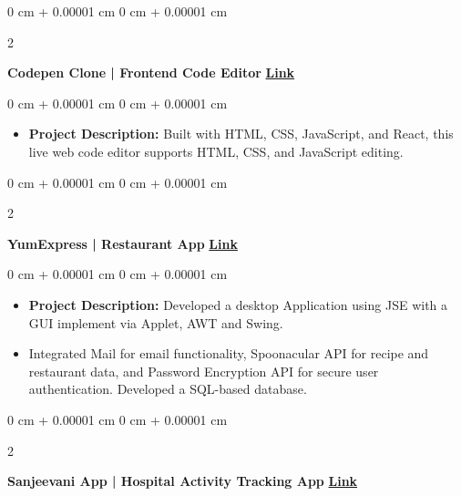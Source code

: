\documentclass[10pt, letterpaper]{article}
\newenvironment{highlights}{
    \begin{itemize}[
        topsep=0.10 cm,
        parsep=0.10 cm,
        partopsep=0pt,
        itemsep=0pt,
        leftmargin=0 cm + 10pt
    ]
}{
    \end{itemize}
}
\newenvironment{onecolentry}{
    \begin{adjustwidth}{
        0 cm + 0.00001 cm
    }{
        0 cm + 0.00001 cm
    }
}{
    \end{adjustwidth}
}
\newenvironment{twocolentry}[2][]{
    \onecolentry
    \def\secondColumn{#2}
    \setcolumnwidth{\fill, 4.5 cm}
    \begin{paracol}{2}
}{
    \switchcolumn \raggedleft \secondColumn
    \end{paracol}
    \endonecolentry
}
\begin{document}
        \begin{twocolentry}{
            \href{https://github.com/saxenabharti/Codepen-clone}{\textbf{\textcolor{highlightColor}{Link}}}
        }
            \textbf{Codepen Clone | Frontend Code Editor}\end{twocolentry}

        \vspace{0.10 cm}
        \begin{onecolentry}
            \begin{highlights}
                \item \textbf{Project Description:}  Built with HTML, CSS, JavaScript, and React, this live web
code editor supports HTML, CSS, and JavaScript editing.
            \end{highlights}
        \end{onecolentry}

        \vspace{0.2 cm}
        \begin{twocolentry}{
            \href{https://github.com/saxenabharti/YumiExpress}{\textbf{\textcolor{highlightColor}{Link}}}
        }
            \textbf{YumExpress | Restaurant App}\end{twocolentry}

        \vspace{0.10 cm}
        \begin{onecolentry}
            \begin{highlights}
                \item \textbf{Project Description:}  Developed a desktop Application using JSE with a GUI implement via Applet, AWT and Swing.

                \item Integrated Mail for email functionality, Spoonacular API for recipe and restaurant data, and Password Encryption API for secure user authentication. Developed a SQL-based database.

            \end{highlights}
        \end{onecolentry}


        \vspace{0.2 cm}
        
        \begin{twocolentry}{
           \href{https://github.com/saxenabharti/SanjeevaniApplication}{\textbf{\textcolor{highlightColor}{Link}}}
        }
            \textbf{Sanjeevani App | Hospital Activity Tracking App}\end{twocolentry}
\end{document}
